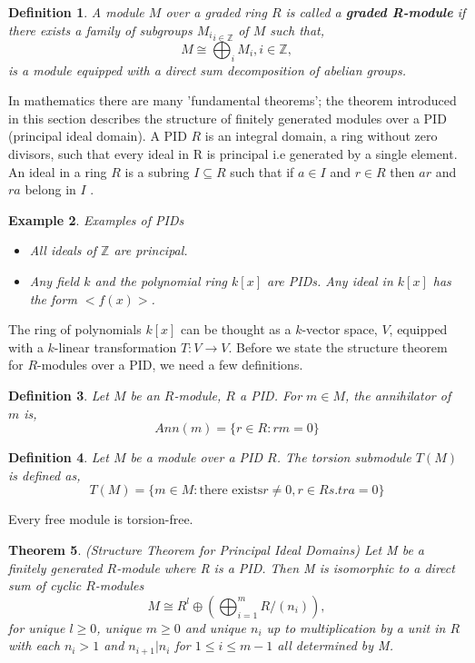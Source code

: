 \documentclass{article}
\newcommand{\be}{\begin{equation}}
\newcommand{\ee}{\end{equation}}
\newtheorem{theorem}{Theorem}[section]
\newtheorem{definition}[theorem]{Definition}
\newtheorem{example}[theorem]{Example}
\begin{document}
\begin{definition}
A module $M$ over a graded ring $R$ is called a \textbf{graded R-module} if there exists a family of subgroups ${M_i}_{i\in \mathbb{Z}}$ of $M$ such that,
\be
M \cong \bigoplus_{i}M_{i}, i\in \mathbb{Z},
\ee is a module equipped with a direct sum decomposition of abelian groups.
\end{definition}

In mathematics there are many 'fundamental theorems'; the theorem introduced in this section describes the structure of finitely generated modules over a PID (principal ideal domain). A PID $R$ is an integral domain, a ring without zero divisors, such that every ideal in R is principal i.e generated by a single element. An ideal in a ring $R$ is a subring $I \subseteq R$ such that if $a \in I$ and $r \in R$ then $ar$ and $ra$ belong in $I$  \cite{SYMONDS2007408structure}.
\begin{example} Examples of PIDs

\begin{itemize}
    \item All ideals of $\mathbb{Z}$ are principal.
    \item Any field $k$ and the polynomial ring $k[x]$ are PIDs. Any ideal in $k[x]$ has the form $<f(x)>$.
\end{itemize}
\end{example}
The ring of polynomials $k[x]$ can be thought as a $k$-vector space, $V$, equipped with a $k$-linear transformation $T: V \to V$. 
Before we state the structure theorem for $R$-modules over a PID, we need a few definitions.
\begin{definition}Let $M$ be an $R$-module, $R$ a PID. For $m \in M$, the annihilator of $m$ is,
\be
Ann(m) = \{r \in R : rm = 0\}
\ee
\end{definition}
\begin{definition} Let $M$ be a module over a PID $R$. The torsion submodule $T(M)$ is defined as,
\be
T(M) = \{m\in M : \text{there exists}   r\neq 0, r\in R s.t ra=0 \} 
\ee
\end{definition}
Every free module is torsion-free.
\begin{theorem}(Structure Theorem for Principal Ideal Domains) Let M be a finitely generated $R$-module where R is a PID. Then M is isomorphic to a direct sum of cyclic $R$-modules
\be
M \cong R^{l} \oplus (\bigoplus^{m}_{i=1} R/(n_i)),
\ee
for unique $l\geq 0$, unique $m\geq 0$ and unique $n_i$ up to multiplication by a unit in $R$ with each $n_i > 1$ and $n_{i+1}|n_i$ for $1\leq i \leq m-1$ all determined by M.
\end{theorem}
\end{document}
